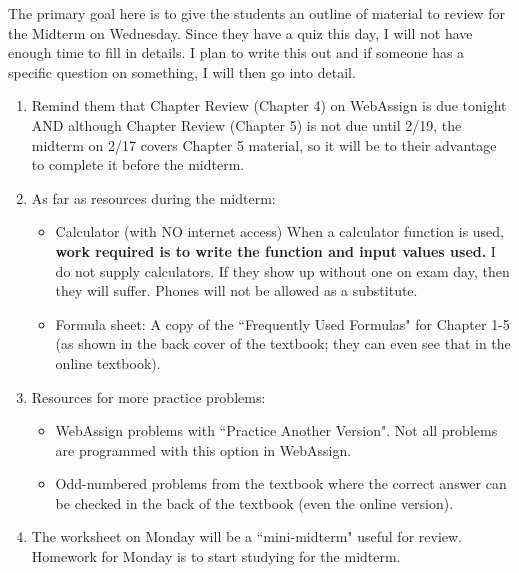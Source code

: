 \documentclass{article}
\begin{document}
The primary goal here is to give the students an outline of material to review for the Midterm on Wednesday. Since they have a quiz this day, I will not have enough time to fill in details. I plan to write this out and if someone has a specific question on something, I will then go into detail.

\begin{enumerate}

    \item Remind them that Chapter Review (Chapter 4) on WebAssign is due tonight AND although Chapter Review (Chapter 5) is not due until 2/19, the midterm on 2/17 covers Chapter 5 material, so it will be to their advantage to complete it before the midterm.

    \item As far as resources during the midterm:
        
        \begin{itemize}
        
            \item Calculator (with NO internet access) When a calculator function is used, \textbf{work required is to write the function and input values used.} I do not supply calculators. If they show up without one on exam day, then they will suffer. Phones will not be allowed as a substitute.
            
            \item Formula sheet: A copy of the ``Frequently Used Formulas" for Chapter 1-5 (as shown in the back cover of the textbook; they can even see that in the online textbook).
            
        \end{itemize}
        
    \item Resources for more practice problems:
        
        \begin{itemize}
        
            \item WebAssign problems with ``Practice Another Version".  Not all problems are programmed with this option in WebAssign.
            
            \item Odd-numbered problems from the textbook where the correct answer can be checked in the back of the textbook (even the online version).
            
        \end{itemize}
    
    \item The worksheet on Monday will be a ``mini-midterm" useful for review. Homework for Monday is to start studying for the midterm.
    
\end{enumerate}
\end{document}
